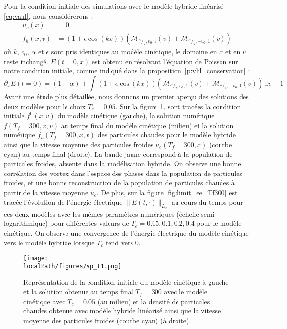 Pour la condition initiale des simulations avec le modèle hybride linéarisé \eqref{eq:vahl}, nous considérerons :
\begin{equation}
  \begin{aligned}
    u_c(x)   & = 0 \\
    f_h(x,v) & = (1+\epsilon\cos(kx))\left( \mathcal{M}_{^\alpha/_2,v_0,1}(v) + \mathcal{M}_{^\alpha/_2,-v_0,1}(v) \right)
  \end{aligned}
\label{eq:HL:init}
\end{equation}
où $k$, $v_0$, $\alpha$ et $\epsilon$ sont pris identiques au modèle cinétique, le domaine en $x$ et en $v$ reste inchangé. $E(t=0,x)$ est obtenu en résolvant l'équation de Poisson sur notre condition initiale, comme indiqué dans la proposition~\ref{p:vhl_conservation} :
$$
  \partial_x E(t=0) = (1-\alpha) + \int (1+\epsilon\cos(kx))\left( \mathcal{M}_{^\alpha/_2,v_0,1}(v) + \mathcal{M}_{^\alpha/_2,-v_0,1}(v) \right)\,\mathrm{d}v - 1
$$
Avant une étude plus détaillée, nous donnons un premier aperçu des solutions des deux modèles pour le choix $T_c=0.05$. Sur la figure~\ref{fig:limit_vp}, sont tracées la condition initiale $f^0(x, v)$ du modèle cinétique (gauche), la solution numérique  $f(T_f=300, x, v)$ au temps final du modèle cinétique (milieu) et la solution numérique $f_h(T_f=300, x, v)$ des particules chaudes pour le modèle hybride ainsi que la vitesse moyenne des particules froides $u_c(T_f=300,x)$ (courbe cyan) au temps final (droite). La bande jaune correspond à la population de particules froides, absente dans la modélisation hybride. On observe une bonne corrélation des vortex dans l'espace des phases dans la population de particules froides, et une bonne reconstruction de la population de particules chaudes à partir de la vitesse moyenne $u_c$. De plus, sur la figure \ref{fig:limit_ee_Tf300} est tracée l'évolution de l'énergie électrique $\|E(t, \cdot)\|_{L_2}$ au cours du temps pour ces deux modèles avec les mêmes paramètres numériques (échelle semi-logarithmique) pour différentes valeurs de $T_c=0.05,0.1,0.2,0.4$ pour le modèle cinétique. On observe une convergence de l'énergie électrique du modèle cinétique vers le modèle hybride lorsque $T_c$ tend vers $0$.
\begin{figure}[h]
  \centering
  \texttt{[image: \\localPath/figures/vp\_t1.png]}
  \caption{Représentation de la condition initiale du modèle cinétique à gauche et la solution obtenue au temps final $T_f=300$ avec le modèle cinétique avec $T_c = 0.05$ (au milieu) et la densité de particules chaudes obtenue avec modèle hybride linéarisé ainsi que la vitesse moyenne des particules froides (courbe cyan) (à droite).}
  \label{fig:limit_vp}
\end{figure}
